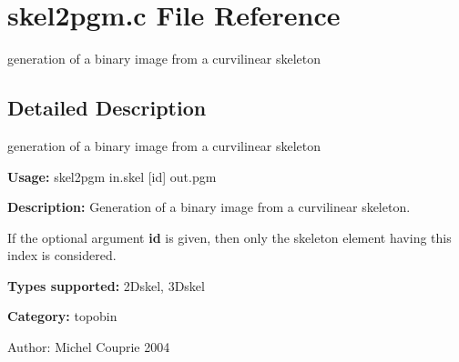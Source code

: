 \section{skel2pgm.c File Reference}
\label{skel2pgm_8c}
generation of a binary image from a curvilinear skeleton 



\subsection{Detailed Description}
generation of a binary image from a curvilinear skeleton 

{\bf Usage:} skel2pgm in.skel [id] out.pgm

{\bf Description:} Generation of a binary image from a curvilinear skeleton.

If the optional argument {\bf id} is given, then only the skeleton element having this index is considered.

{\bf Types supported:} 2Dskel, 3Dskel

{\bf Category:} topobin

\begin{Desc}
\item[Author:]Michel Couprie 2004 \end{Desc}
